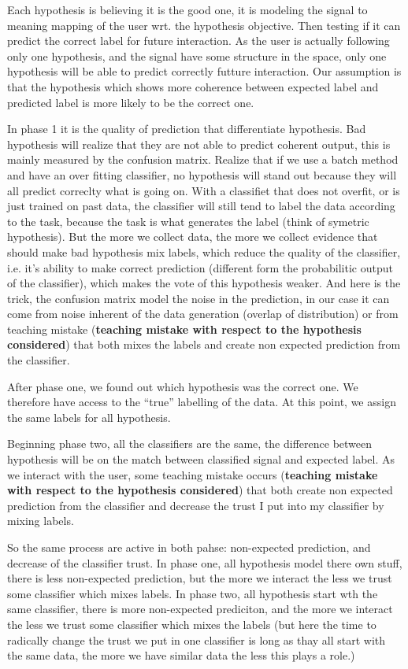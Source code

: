 Each hypothesis is believing it is the good one, it is modeling the signal to meaning mapping of the user wrt. the hypothesis objective. Then testing if it can predict the correct label for future interaction. As the user is actually following only one hypothesis, and the signal have some structure in the space, only one hypothesis will be able to predict correctly futture interaction. Our assumption is that the hypothesis which shows more coherence between expected label and predicted label is more likely to be the correct one. 

In phase 1 it is the quality of prediction that differentiate hypothesis. Bad hypothesis will realize that they are not able to predict coherent output, this is mainly measured by the confusion matrix. Realize that if we use a batch method and have an over fitting classifier, no hypothesis will stand out because they will all predict correclty what is going on. With a classifiet that does not overfit, or is just trained on past data, the classifier will still tend to label the data according to the task, because the task is what generates the label (think of symetric hypothesis). But the more we collect data, the more we collect evidence that should make bad hypothesis mix labels, which reduce the quality of the classifier, i.e. it's ability to make correct prediction (different form the probabilitic output of the classifier), which makes the vote of this hypothesis weaker. And here is the trick, the confusion matrix model the noise in the prediction, in our case it can come from noise inherent of the data generation (overlap of distribution) or from teaching mistake (\textbf{teaching mistake with respect to the hypothesis considered}) that both mixes the labels and create non expected prediction from the classifier.

After phase one, we found out which hypothesis was the correct one. We therefore have access to the ``true'' labelling of the data. At this point, we assign the same labels for all hypothesis.

Beginning phase two, all the classifiers are the same, the difference between hypothesis will be on the match between classified signal and expected label. As we interact with the user, some teaching mistake occurs (\textbf{teaching mistake with respect to the hypothesis considered}) that both create non expected prediction from the classifier and decrease the trust I put into my classifier by mixing labels.

So the same process are active in both pahse: non-expected prediction, and decrease of the classifier trust.
In phase one, all hypothesis model there own stuff, there is less non-expected prediction, but the more we interact the less we trust some classifier which mixes labels.
In phase two, all hypothesis start wth the same classifier, there is more non-expected prediciton, and the more we interact the less we trust some classifier which mixes the labels (but here the time to radically change the trust we put in one classifier is long as thay all start with the same data, the more we have similar data the less this plays a role.)

